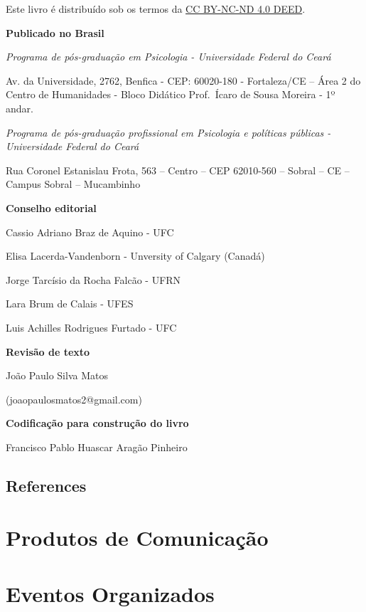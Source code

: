 \documentclass[
  letterpaper,
  DIV=11,
  numbers=noendperiod,
  oneside]{scrreprt}
\newlength{\cslhangindent}
\newlength{\cslentryspacingunit} %
\newenvironment{CSLReferences}[2] %
 {%
  \setlength{\parindent}{0pt}
  \ifodd #1
  \let\oldpar\par
  \def\par{\hangindent=\cslhangindent\oldpar}
  \fi
  \setlength{\parskip}{#2\cslentryspacingunit}
 }%
 {}
\begin{document}
Este livro é distribuído sob os termos da
\href{https://creativecommons.org/licenses/by-nc-nd/4.0/}{CC BY-NC-ND
4.0 DEED}.

\textbf{Publicado no Brasil}

\emph{Programa de pós-graduação em Psicologia - Universidade Federal do
Ceará}

Av. da Universidade, 2762, Benfica - CEP: 60020-180 - Fortaleza/CE --
Área 2 do Centro de Humanidades - Bloco Didático Prof.~Ícaro de Sousa
Moreira - 1º andar.

\emph{Programa de pós-graduação profissional em Psicologia e políticas
públicas - Universidade Federal do Ceará}

Rua Coronel Estanislau Frota, 563 -- Centro -- CEP 62010-560 -- Sobral
-- CE -- Campus Sobral -- Mucambinho

\textbf{Conselho editorial}

Cassio Adriano Braz de Aquino - UFC

Elisa Lacerda-Vandenborn - Unversity of Calgary (Canadá)

Jorge Tarcísio da Rocha Falcão - UFRN

Lara Brum de Calais - UFES

Luis Achilles Rodrigues Furtado - UFC

\textbf{Revisão de texto}

João Paulo Silva Matos

(joaopaulosmatos2@gmail.com)

\textbf{Codificação para construção do livro}

Francisco Pablo Huascar Aragão Pinheiro


\hypertarget{references}{%
\chapter*{References}\label{references}}


\hypertarget{refs}{}
\begin{CSLReferences}{0}{0}
\end{CSLReferences}

\part{Produtos de Comunicação}

\part{Eventos Organizados}
\end{document}
